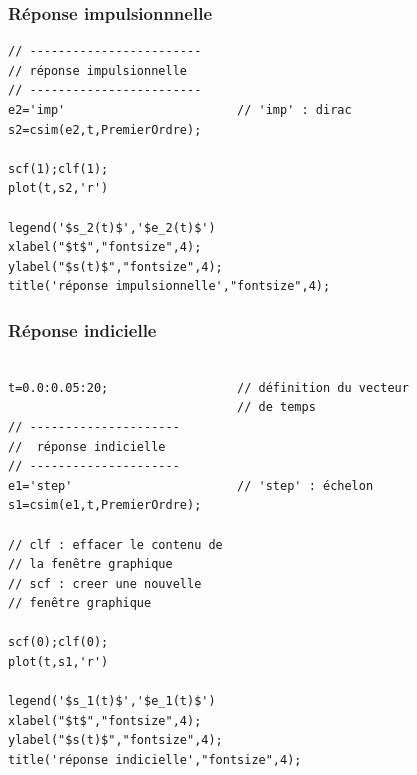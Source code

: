 \subsubsection{Réponse impulsionnnelle}
\begin{code}
\begin{verbatim}
// ------------------------
// réponse impulsionnelle
// ------------------------
e2='imp'                        // 'imp' : dirac
s2=csim(e2,t,PremierOrdre);   

scf(1);clf(1);
plot(t,s2,'r')

legend('$s_2(t)$','$e_2(t)$')
xlabel("$t$","fontsize",4);
ylabel("$s(t)$","fontsize",4); 
title('réponse impulsionnelle',"fontsize",4);
\end{verbatim}
\end{code}

\subsubsection{Réponse indicielle}
\begin{code}
\begin{verbatim}

t=0.0:0.05:20;                  // définition du vecteur 
                                // de temps
// ---------------------
//  réponse indicielle
// ---------------------
e1='step'                       // 'step' : échelon
s1=csim(e1,t,PremierOrdre);    

// clf : effacer le contenu de
// la fenêtre graphique
// scf : creer une nouvelle 
// fenêtre graphique

scf(0);clf(0);
plot(t,s1,'r')

legend('$s_1(t)$','$e_1(t)$')
xlabel("$t$","fontsize",4);
ylabel("$s(t)$","fontsize",4); 
title('réponse indicielle',"fontsize",4);
\end{verbatim}
\end{code}



